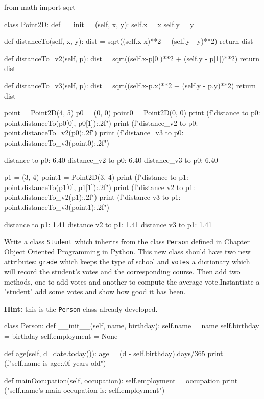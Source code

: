 \cprotEnv\begin{solution}
\begin{ipython}
from math import sqrt

class Point2D:
    def __init__(self, x, y):
        self.x = x
        self.y = y

    def distanceTo(self, x, y):
        dist = sqrt((self.x-x)**2 + (self.y - y)**2)
        return dist

    def distanceTo_v2(self, p):
        dist = sqrt((self.x-p[0])**2 + (self.y - p[1])**2)
        return dist

    def distanceTo_v3(self, p):
        dist = sqrt((self.x-p.x)**2 + (self.y - p.y)**2)
        return dist

point = Point2D(4, 5)
p0 = (0, 0)
point0 = Point2D(0, 0)
print (f"distance to p0: {point.distanceTo(p0[0], p0[1]):.2f}")
print (f"distance_v2 to p0: {point.distanceTo_v2(p0):.2f}")
print (f"distance_v3 to p0: {point.distanceTo_v3(point0):.2f}")
\end{ipython}
\begin{ioutput}
distance to p0: 6.40
distance_v2 to p0: 6.40
distance_v3 to p0: 6.40
\end{ioutput}
\begin{ipython}
p1 = (3, 4)
point1 = Point2D(3, 4)
print (f"distance to p1: {point.distanceTo(p1[0], p1[1]):.2f}")
print (f"distance v2 to p1: {point.distanceTo_v2(p1):.2f}")
print (f"distance v3 to p1: {point.distanceTo_v3(point1):.2f}")
\end{ipython}
\begin{ioutput}
distance to p1: 1.41
distance v2 to p1: 1.41
distance v3 to p1: 1.41
\end{ioutput}
\end{solution}

\cprotEnv\begin{question}
Write a class \texttt{Student} which inherits from the class \texttt{Person} defined in Chapter Object Oriented Programming in Python. This new class should have two new attributes: \texttt{grade} which keeps the type of school and \texttt{votes} a dictionary which will record the student's votes and the corresponding course. Then add two methods, one to add votes and another to compute the average vote.Instantiate a "student" add some votes and show how good it has been.

\noindent\textbf{Hint:} this is the \texttt{Person} class already developed.

\begin{ipython}
class Person:
    def __init__(self, name, birthday):
        self.name = name
        self.birthday = birthday
        self.employment = None

    def age(self, d=date.today()):
        age = (d - self.birthday).days/365
        print (f"{self.name} is {age:.0f} years old")

    def mainOccupation(self, occupation):
        self.employment = occupation
        print ("{self.name}'s main occupation is: {self.employment}")
\end{ipython}
\end{question}

